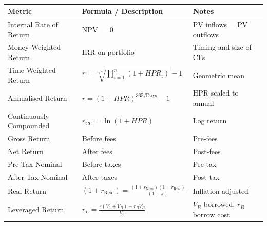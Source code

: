 \documentclass[a4paper,oneside,openany]{book}
\begin{document}
\begin{definition} \\
\begin{tabular}{p{4.6cm}p{5.5cm}p{5cm}}
\hline
\textbf{Metric} & \textbf{Formula / Description} & \textbf{Notes} \\
\hline
Internal Rate of Return & NPV $= 0$ & PV inflows = PV outflows \\
\hline
Money-Weighted Return & IRR on portfolio & Timing and size of CFs \\
\hline
Time-Weighted Return & $r = \sqrt[1/n]{\prod\limits_{i=1}^n (1+HPR_i)} - 1$ & Geometric mean \\
\hline
Annualised Return & $r = (1+HPR)^{365/\text{Days}} - 1$ & HPR scaled to annual \\
\hline
Continuously Compounded & $r_{\text{CC}} = \ln(1+HPR)$ & Log return \\
\hline
Gross Return & Before fees & Pre-fees \\
\hline
Net Return & After fees & Post-fees \\
\hline
Pre-Tax Nominal & Before taxes & Pre-tax \\
\hline
After-Tax Nominal & After taxes & Post-tax \\
\hline
Real Return & $(1 + r_{\text{Real}}) = \frac{(1 + r_{\text{Nom}}) (1 + r_{\text{Risk}})}{(1 + \pi)}$ & Inflation-adjusted \\
\hline
Leveraged Return & $r_L = \frac{r(V_0 + V_B) - r_B V_B}{V_0}$ & $V_B$ borrowed, $r_B$ borrow cost \\
\hline
\end{tabular}
\end{definition}
\end{document}
